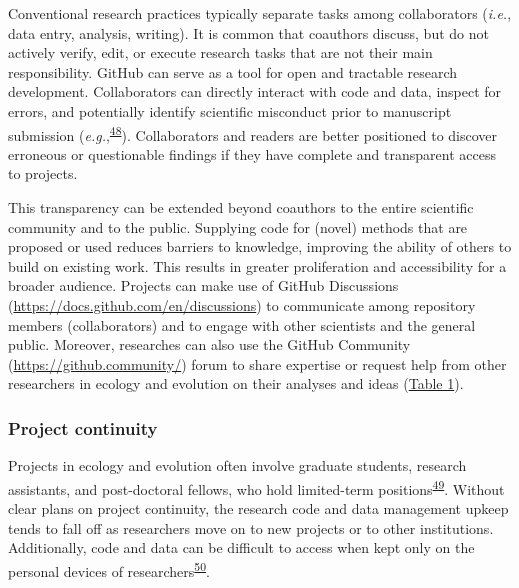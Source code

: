 Conventional research practices typically separate tasks among collaborators (\emph{i.e.}, data entry, analysis, writing).
It is common that coauthors discuss, but do not actively verify, edit, or execute research tasks that are not their main responsibility.
GitHub can serve as a tool for open and tractable research development.
Collaborators can directly interact with code and data, inspect for errors, and potentially identify scientific misconduct prior to manuscript submission (\emph{e.g.},\textsuperscript{\protect\hyperlink{ref-18PTmKJkq}{48}}).
Collaborators and readers are better positioned to discover erroneous or questionable findings if they have complete and transparent access to projects.

This transparency can be extended beyond coauthors to the entire scientific community and to the public.
Supplying code for (novel) methods that are proposed or used reduces barriers to knowledge, improving the ability of others to build on existing work.
This results in greater proliferation and accessibility for a broader audience.
Projects can make use of GitHub Discussions (\url{https://docs.github.com/en/discussions}) to communicate among repository members (collaborators) and to engage with other scientists and the general public.
Moreover, researches can also use the GitHub Community (\url{https://github.community/}) forum to share expertise or request help from other researchers in ecology and evolution on their analyses and ideas (\protect\hyperlink{tbl:roles}{Table 1}).

\hypertarget{project-continuity}{%
\subsubsection{Project continuity}\label{project-continuity}}

Projects in ecology and evolution often involve graduate students, research assistants, and post-doctoral fellows, who hold limited-term positions\textsuperscript{\protect\hyperlink{ref-D4C4k4ak}{49}}.
Without clear plans on project continuity, the research code and data management upkeep tends to fall off as researchers move on to new projects or to other institutions.
Additionally, code and data can be difficult to access when kept only on the personal devices of researchers\textsuperscript{\protect\hyperlink{ref-19kmNxiHc}{50}}.

